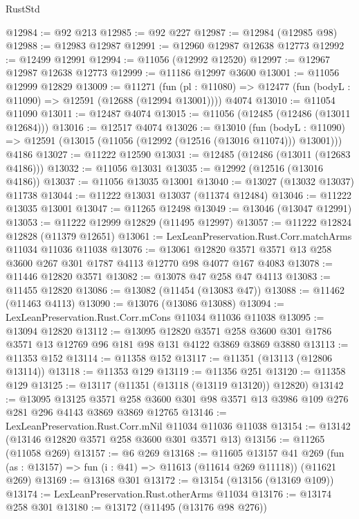 \begin{lexlean}{RustStd}
\begin{coremodule}
@12984 := @92 @213
@12985 := @92 @227
@12987 := @12984 (@12985 @98)
@12988 := @12983 @12987
@12991 := @12960 @12987 @12638 @12773
@12992 := @12499 @12991
@12994 := @11056 (@12992 @12520)
@12997 := @12967 @12987 @12638 @12773
@12999 := @11186 @12997 @3600
@13001 := @11056 @12999 @12829
@13009 := @11271
    (fun (pl : @11080) => @12477 (fun (bodyL : @11090) => @12591 (@12688 (@12994 @13001))))
    @4074
@13010 := @11054 @11090
@13011 := @12487 @4074
@13015 := @11056 (@12485 (@12486 (@13011 @12684)))
@13016 := @12517 @4074
@13026 := @13010
    (fun (bodyL : @11090) => @12591 (@13015 (@11056 (@12992 (@12516 (@13016 @11074))) @13001)))
    @4186
@13027 := @11222 @12590
@13031 := @12485 (@12486 (@13011 (@12683 @4186)))
@13032 := @11056 @13031
@13035 := @12992 (@12516 (@13016 @4186))
@13037 := @11056 @13035 @13001
@13040 := @13027 (@13032 @13037) @11738
@13044 := @11222 @13031 @13037 (@11374 @12484)
@13046 := @11222 @13035 @13001
@13047 := @11265 @12498
@13049 := @13046 (@13047 @12991)
@13053 := @11222 @12999 @12829 (@11495 @12997)
@13057 := @11222 @12824 @12828 (@11379 @12651)
@13061 := LexLeanPreservation.Rust.Corr.matchArms @11034 @11036 @11038
@13076 := @13061 @12820 @3571 @3571 @13 @258 @3600 @267 @301 @1787 @4113 @12770 @98 @4077 @167 @4083
@13078 := @11446 @12820 @3571
@13082 := @13078 @47 @258 @47 @4113
@13083 := @11455 @12820
@13086 := @13082 (@11454 (@13083 @47))
@13088 := @11462 (@11463 @4113)
@13090 := @13076 (@13086 @13088)
@13094 := LexLeanPreservation.Rust.Corr.mCons @11034 @11036 @11038
@13095 := @13094 @12820
@13112 := @13095
    @12820
    @3571
    @258
    @3600
    @301
    @1786
    @3571
    @13
    @12769
    @96
    @181
    @98
    @131
    @4122
    @3869
    @3869
    @3880
@13113 := @11353 @152
@13114 := @11358 @152
@13117 := @11351 (@13113 (@12806 @13114))
@13118 := @11353 @129
@13119 := @11356 @251
@13120 := @11358 @129
@13125 := @13117 (@11351 (@13118 (@13119 @13120)) @12820)
@13142 := @13095
    @13125
    @3571
    @258
    @3600
    @301
    @98
    @3571
    @13
    @3986
    @109
    @276
    @281
    @296
    @4143
    @3869
    @3869
    @12765
@13146 := LexLeanPreservation.Rust.Corr.mNil @11034 @11036 @11038
@13154 := @13142 (@13146 @12820 @3571 @258 @3600 @301 @3571 @13)
@13156 := @11265 (@11058 @269)
@13157 := @6 @269
@13168 := @11605
    @13157
    @41
    @269
    (fun (as : @13157) => fun (i : @41) => @11613 (@11614 @269 @11118))
    (@11621 @269)
@13169 := @13168 @301
@13172 := @13154 (@13156 (@13169 @109))
@13174 := LexLeanPreservation.Rust.otherArms @11034
@13176 := @13174 @258 @301
@13180 := @13172 (@11495 (@13176 @98 @276))

\end{coremodule}
\end{lexlean}
